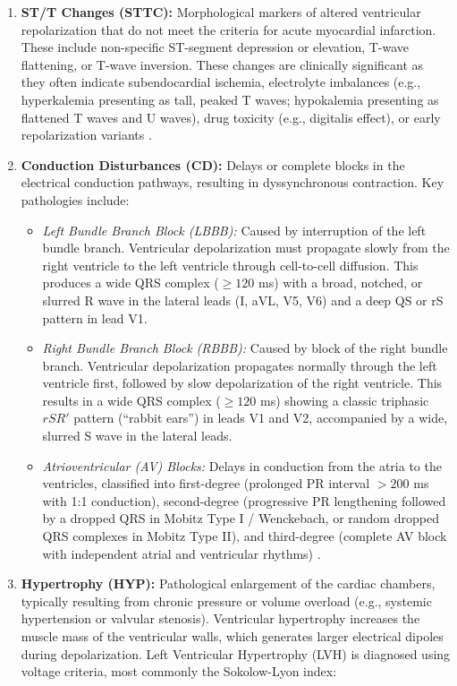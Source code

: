 \documentclass[12pt,a4paper]{report}
\begin{document}
\begin{enumerate}
    \item \textbf{ST/T Changes (STTC):} Morphological markers of altered ventricular repolarization that do not meet the criteria for acute myocardial infarction. These include non-specific ST-segment depression or elevation, T-wave flattening, or T-wave inversion. These changes are clinically significant as they often indicate subendocardial ischemia, electrolyte imbalances (e.g., hyperkalemia presenting as tall, peaked T waves; hypokalemia presenting as flattened T waves and U waves), drug toxicity (e.g., digitalis effect), or early repolarization variants \cite{schlapfer2017ecg}.
    \item \textbf{Conduction Disturbances (CD):} Delays or complete blocks in the electrical conduction pathways, resulting in dyssynchronous contraction. Key pathologies include:
    \begin{itemize}
        \item \emph{Left Bundle Branch Block (LBBB):} Caused by interruption of the left bundle branch. Ventricular depolarization must propagate slowly from the right ventricle to the left ventricle through cell-to-cell diffusion. This produces a wide QRS complex ($\ge 120$ ms) with a broad, notched, or slurred R wave in the lateral leads (I, aVL, V5, V6) and a deep QS or rS pattern in lead V1.
        \item \emph{Right Bundle Branch Block (RBBB):} Caused by block of the right bundle branch. Ventricular depolarization propagates normally through the left ventricle first, followed by slow depolarization of the right ventricle. This results in a wide QRS complex ($\ge 120$ ms) showing a classic triphasic $rSR'$ pattern (``rabbit ears'') in leads V1 and V2, accompanied by a wide, slurred S wave in the lateral leads.
        \item \emph{Atrioventricular (AV) Blocks:} Delays in conduction from the atria to the ventricles, classified into first-degree (prolonged PR interval $>200$ ms with 1:1 conduction), second-degree (progressive PR lengthening followed by a dropped QRS in Mobitz Type I / Wenckebach, or random dropped QRS complexes in Mobitz Type II), and third-degree (complete AV block with independent atrial and ventricular rhythms) \cite{schlapfer2017ecg, hannun2019cardiologist}.
    \end{itemize}
    \item \textbf{Hypertrophy (HYP):} Pathological enlargement of the cardiac chambers, typically resulting from chronic pressure or volume overload (e.g., systemic hypertension or valvular stenosis). Ventricular hypertrophy increases the muscle mass of the ventricular walls, which generates larger electrical dipoles during depolarization. Left Ventricular Hypertrophy (LVH) is diagnosed using voltage criteria, most commonly the Sokolow-Lyon index:

\end{enumerate}
\end{document}
